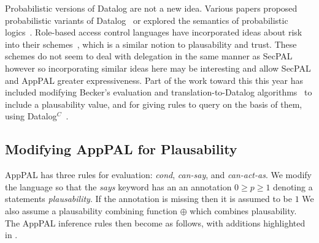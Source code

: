 \documentclass[thesis.tex]{subfiles}
\begin{document}
Probabilistic versions of Datalog are not a new idea.  Various papers proposed
probabilistic variants of Datalog~\cite{fuhr_probabilistic_1995} or explored the
semantics of probabilistic logics~\cite{halpern_analysis_1990}.  Role-based
access control languages have incorporated ideas about risk into their
schemes~\cite{josang_analysing_2004,dimmock_using_2004,salim_approach_2011},
which is a similar notion to plausability and trust.  These schemes do not seem
to deal with delegation in the same manner as SecPAL however so incorporating
similar ideas here may be interesting and allow SecPAL and AppPAL greater
expressiveness.  Part of the work toward this this year has included modifying Becker's
evaluation and translation-to-Datalog algorithms~\cite{becker_secpal:_2010} to
include a plausability value, and for giving rules to query on the basis of
them, using Datalog$^C$~\cite{li_datalog_2003}.

\subsection{Modifying AppPAL for Plausability}

AppPAL has three rules for evaluation: \emph{cond}, \emph{can-say},
and \emph{can-act-as}.  We modify the language so that the \emph{says}
keyword has an an annotation $0 \geq p \geq 1$ denoting a statements
\emph{plausability}.  If the annotation is missing then it is assumed
to be $1$ We also assume a plausability combining function $\oplus$
which combines plausability.  The AppPAL inference rules then become
as follows, with additions highlighted in .
\end{document}
